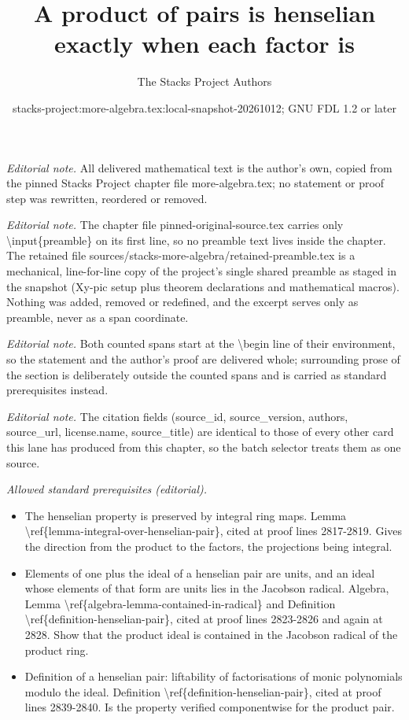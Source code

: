 \documentclass[10pt,a4paper]{amsart}
\title{A product of pairs is henselian exactly when each factor is}
\author{The Stacks Project Authors}
\date{stacks-project:more-algebra.tex:local-snapshot-20261012; GNU FDL 1.2 or later}
\theoremstyle{plain}
\theoremstyle{definition}
\theoremstyle{remark}
\numberwithin{equation}{subsection}
\begin{document}
\maketitle
\setcounter{subsection}{1}
\noindent\textit{Editorial note.} All delivered mathematical text is the author's own, copied from the pinned Stacks Project chapter file more-algebra.tex; no statement or proof step was rewritten, reordered or removed.\par\medskip
\noindent\textit{Editorial note.} The chapter file pinned-original-source.tex carries only \textbackslash{}input\{preamble\} on its first line, so no preamble text lives inside the chapter. The retained file sources/stacks-more-algebra/retained-preamble.tex is a mechanical, line-for-line copy of the project's single shared preamble as staged in the snapshot (Xy-pic setup plus theorem declarations and mathematical macros). Nothing was added, removed or redefined, and the excerpt serves only as preamble, never as a span coordinate.\par\medskip
\noindent\textit{Editorial note.} Both counted spans start at the \textbackslash{}begin line of their environment, so the statement and the author's proof are delivered whole; surrounding prose of the section is deliberately outside the counted spans and is carried as standard prerequisites instead.\par\medskip
\noindent\textit{Editorial note.} The citation fields (source\_id, source\_version, authors, source\_url, license.name, source\_title) are identical to those of every other card this lane has produced from this chapter, so the batch selector treats them as one source.\par\medskip
\noindent\textit{Allowed standard prerequisites (editorial).}\begin{itemize}
\item The henselian property is preserved by integral ring maps. Lemma \textbackslash{}ref\{lemma-integral-over-henselian-pair\}, cited at proof lines 2817-2819. Gives the direction from the product to the factors, the projections being integral.
\item Elements of one plus the ideal of a henselian pair are units, and an ideal whose elements of that form are units lies in the Jacobson radical. Algebra, Lemma \textbackslash{}ref\{algebra-lemma-contained-in-radical\} and Definition \textbackslash{}ref\{definition-henselian-pair\}, cited at proof lines 2823-2826 and again at 2828. Show that the product ideal is contained in the Jacobson radical of the product ring.
\item Definition of a henselian pair: liftability of factorisations of monic polynomials modulo the ideal. Definition \textbackslash{}ref\{definition-henselian-pair\}, cited at proof lines 2839-2840. Is the property verified componentwise for the product pair.
\end{itemize}\medskip
\end{document}
